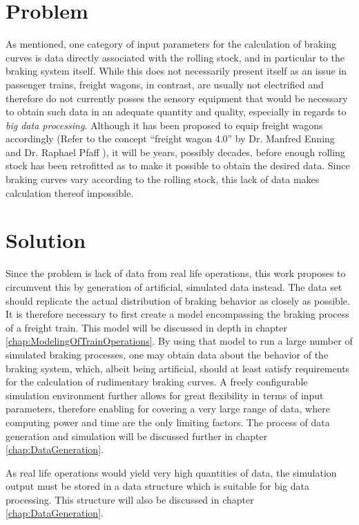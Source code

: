 \section{Problem}
\label{sec:Problem}

\par\noindent
As mentioned, one category of input parameters for the calculation of braking curves is data directly associated with the rolling stock, and in particular to the braking system itself. While this does not necessarily present itself as an issue in passenger trains, freight wagons, in contrast, are usually not electrified and therefore do not currently posses the sensory equipment that would be necessary to obtain such data in an adequate quantity and quality, especially in regards to \textit{big data processing}. Although it has been proposed to equip freight wagons accordingly (Refer to the concept \enquote{freight wagon 4.0} by Dr. Manfred Enning and Dr. Raphael Pfaff \cite{Enning2017}), it will be years, possibly decades, before enough rolling stock has been retrofitted as to make it possible to obtain the desired data. Since braking curves vary according to the rolling stock, this lack of data makes calculation thereof impossible.

\section{Solution}
\label{sec:Solution}

\par\noindent
Since the problem is lack of data from real life operations, this work proposes to circumvent this by generation of artificial, simulated data instead. The data set should replicate the actual distribution of braking behavior as closely as possible. It is therefore necessary to first create a model encompassing the braking process of a freight train. This model will be discussed in depth in chapter \ref{chap:ModelingOfTrainOperations}. By using that model to run a large number of simulated braking processes, one may obtain data about the behavior of the braking system, which, albeit being artificial, should at least satisfy requirements for the calculation of rudimentary braking curves. A freely configurable simulation environment further allows for great flexibility in terms of input parameters, therefore enabling for covering a very large range of data, where computing power and time are the only limiting factors. The process of data generation and simulation will be discussed further in chapter \ref{chap:DataGeneration}.
\par
As real life operations would yield very high quantities of data, the simulation output must be stored in a data structure which is suitable for big data processing. This structure will also be discussed in chapter \ref{chap:DataGeneration}.